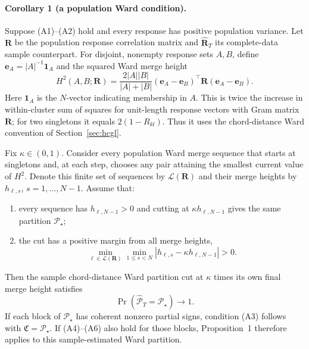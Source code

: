 \documentclass[11pt,a4paper]{article}
\begin{document}
\paragraph{Corollary 1 (a population Ward condition).}
\label{cor:ward-partition}
Suppose (A1)--(A2) hold and every response has positive population variance.
Let $\bm R$ be the population response correlation matrix and
$\widehat{\bm R}_T$ its complete-data sample counterpart. For disjoint,
nonempty response sets $A,B$, define $\bm e_A=|A|^{-1}\bm1_A$ and the
squared Ward merge height
\begin{equation}\label{eq:ward-population-cost}
 H^2(A,B;\bm R)=
 \frac{2|A||B|}{|A|+|B|}
 (\bm e_A-\bm e_B)^\top\bm R(\bm e_A-\bm e_B).
\end{equation}
Here $\bm1_A$ is the $N$-vector indicating membership in $A$.
This is twice the increase in within-cluster sum of squares for unit-length
response vectors with Gram matrix $\bm R$; for two singletons it equals
$2(1-R_{kl})$. Thus it uses the chord-distance Ward convention of
Section~\ref{sec:hcgl}.

Fix $\kappa\in(0,1)$. Consider every population Ward merge sequence that
starts at singletons and, at each step, chooses any pair attaining the
smallest current value of $H^2$. Denote this finite set of sequences by
$\mathcal L(\bm R)$ and their merge heights by $h_{\ell,s}$,
$s=1,\ldots,N-1$. Assume that:
\begin{enumerate}
 \item every sequence has $h_{\ell,N-1}>0$ and cutting at
 $\kappa h_{\ell,N-1}$ gives the same partition $\mathcal P_\star$;
 \item the cut has a positive margin from all merge heights,
 \[
  \min_{\ell\in\mathcal L(\bm R)}\min_{1\leq s<N}
  |h_{\ell,s}-\kappa h_{\ell,N-1}|>0.
 \]
\end{enumerate}
Then the sample chord-distance Ward partition cut at $\kappa$ times its
own final merge height satisfies
\begin{equation}\label{eq:ward-partition-consistency}
 \Pr(\widehat{\mathcal P}_T=\mathcal P_\star)\longrightarrow1.
\end{equation}
If each block of $\mathcal P_\star$ has coherent nonzero partial signs,
condition (A3) follows with $\mathfrak C=\mathcal P_\star$.
If (A4)--(A6) also hold for those blocks, Proposition~1 therefore applies
to this sample-estimated Ward partition.
\end{document}

